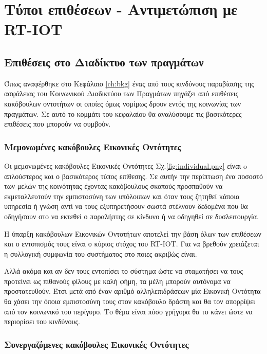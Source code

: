 \chapter{Τύποι επιθέσεων - Αντιμετώπιση με RT-IOT}\label{ch:design}

\section{Επιθέσεις στο Διαδίκτυο των πραγμάτων}

Όπως αναφέρθηκε στο Κεφάλαιο \ref{ch:bkg} ένας από τους κινδύνους παραβίασης της ασφάλειας του Κοινωνικού Διαδικτύου των Πραγμάτων πηγάζει από επιθέσεις κακόβουλων οντοτήτων οι οποίες όμως νομίμως δρουν εντός της κοινωνίας των πραγμάτων. Σε αυτό το κομμάτι του κεφαλαίου θα αναλύσουμε τις βασικότερες επιθέσεις που μπορούν να συμβούν.

\subsection{Μεμονωμένες κακόβουλες Εικονικές Οντότητες}\label{sec:indv}

Οι μεμονωμένες κακόβουλες Εικονικές Οντότητες Σχ.\ref{fig:individual.png} είναι o απλούστερος και ο βασικότερος τύπος επίθεσης. Σε αυτήν την περίπτωση ένα ποσοστό των μελών της κοινότητας έχοντας κακόβουλους σκοπούς προσπαθούν να εκμεταλλευτούν την εμπιστοσύνη των υπόλοιπων και όταν τους ζητηθεί κάποια υπηρεσία ή γνώση αντί να τους εξυπηρετήσουν σωστά στέλνουν δεδομένα που θα οδηγήσουν στο να εκτεθεί ο παραλήπτης σε κίνδυνο ή να οδηγηθεί σε δυσλειτουργία. 

\newpage
Η ύπαρξη κακόβουλων Εικονικών Οντοτήτων αποτελεί την βάση όλων των επιθέσεων και ο εντοπισμός τους είναι ο κύριος στόχος του RT-IOT. Για να βρεθούν χρειάζεται η συλλογική συμφωνία του συστήματος στο ποιες ακριβώς είναι.

Αλλά ακόμα και αν δεν τους εντοπίσει το σύστημα ώστε να σταματήσει να τους προτείνει ως πιθανούς φίλους με καλή φήμη, τα μέλη μπορούν αυτόνομα να προστατευθούν. Έτσι μετά από έναν αριθμό αλληλεπιδράσεων μία Εικονική Οντότητα θα χάσει την όποια εμπιστοσύνη τους στον κακόβουλο δράστη και θα τον απορρίψει από τον κοινωνικό του περίγυρο. Το θέμα είναι πόσο γρήγορα θα το κάνει ώστε να περιορίσει του κινδύνους.



\subsection{Συνεργαζόμενες κακόβουλες Εικονικές Οντότητες}\label{sec:col}


